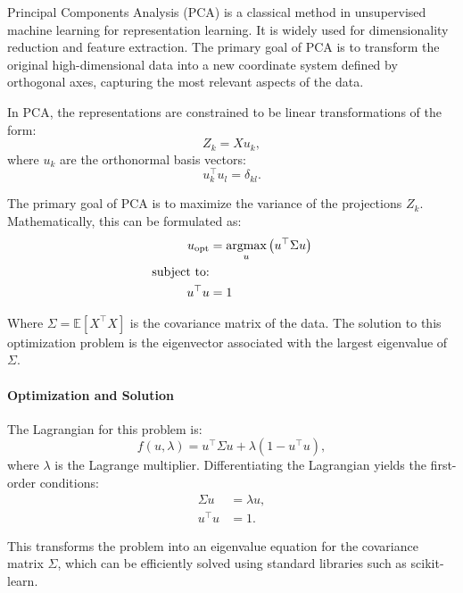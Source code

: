 Principal Components Analysis (PCA)\cite{hotelling1933analysis} is a classical method in unsupervised machine learning for representation learning.
It is widely used for dimensionality reduction and feature extraction.
The primary goal of PCA is to transform the original high-dimensional data into a new coordinate system defined by orthogonal axes, capturing the most relevant aspects of the data.

In PCA, the representations are constrained to be linear transformations of the form:
\begin{equation}\label{eq:pca-linear-function-def}
    Z_k = X u_k,
\end{equation}
where $u_k$ are the orthonormal basis vectors:
\begin{equation}\label{eq:pca-orthonormality-constraint}
    u_k^\top u_l = \delta_{kl}.
\end{equation}

The primary goal of PCA is to maximize the variance of the projections \(Z_k\). Mathematically, this can be formulated
as:
\begin{align}
    u_{\text{opt}} &= \underset{u}{\text{argmax}} \left( u^\top \Sigma u \right) \\
    \text{subject to:} \notag \\
    u^\top u &= 1 \notag
\end{align}

Where \(\Sigma = \mathbb{E}[X^\top X]\) is the covariance matrix of the data. The solution to this optimization problem is the eigenvector associated with the largest eigenvalue of \(\Sigma\).

\paragraph{Optimization and Solution}
The Lagrangian for this problem is:
\begin{equation}
    f(u,\lambda) = u^\top \Sigma u + \lambda(1 - u^\top u),
\end{equation}
where \(\lambda\) is the Lagrange multiplier. Differentiating the Lagrangian yields the first-order conditions:
\begin{align}
    \Sigma u &= \lambda u, \\
    u^\top u &= 1.
\end{align}

This transforms the problem into an eigenvalue equation for the covariance matrix \(\Sigma\), which can be efficiently solved using standard libraries such as scikit-learn\cite{pedregosa2011scikit}.

